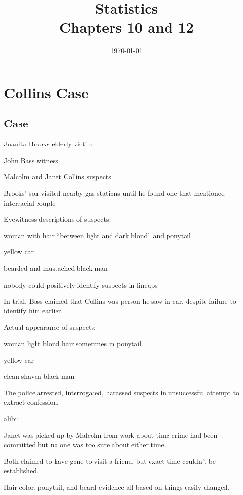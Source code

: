 \documentclass[letterpaper, landscape]{exam}
\title{Statistics \\ Chapters 10 and 12}
\date{\today}
\author{}
\begin{document}
  \maketitle
  \tableofcontents

  \section{Collins Case}

  \subsection{Case}
  \begin{description*}
    \item[Juanita Brooks] elderly victim
    \item[John Bass] witness
    \item[Malcolm and Janet Collins] suspects
  \end{description*}

  Brooks' son visited nearby gas stations until he found one that mentioned
  interracial couple.

  Eyewitness descriptions of suspects:
  \begin{itemize*}
    \item woman with hair ``between light and dark blond'' and ponytail
    \item yellow car
    \item bearded and mustached black man
    \item nobody could positively identify suspects in lineups
    \item In trial, Bass claimed that Collins was person he saw in car, despite
      failure to identify him earlier.
  \end{itemize*}

  Actual appearance of suspects:
  \begin{itemize*}
    \item woman light blond hair sometimes in ponytail
    \item yellow car
    \item clean-shaven black man
  \end{itemize*}

  The police arrested, interrogated, harassed suspects in unsuccessful attempt
  to extract confession.

  alibi:

  \begin{itemize*}
    \item Janet was picked up by Malcolm from work about time crime had been committed but no one
      was too sure about either time.

    \item Both claimed to have gone to visit a friend, but exact time couldn't be established.

    \item Hair color, ponytail, and beard evidence all based on things easily changed.
  \end{itemize*}
\end{document}
